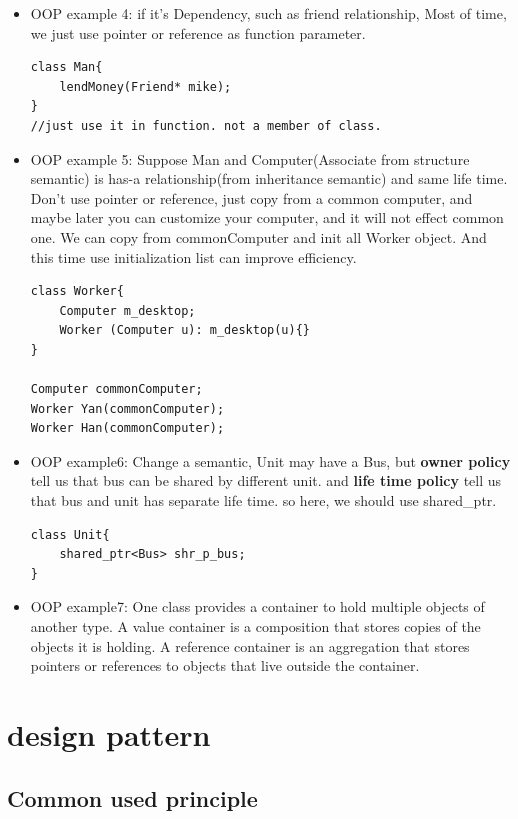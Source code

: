 \documentclass[a4paper,11pt,twoside]{book}
\begin{document}
\begin{itemize}
	\item OOP example 4: if it's Dependency,  such as friend relationship,  Most of time, we just use pointer or reference as function parameter.
\begin{lstlisting}[numbers=none]
class Man{
	lendMoney(Friend* mike);
}
//just use it in function. not a member of class.
\end{lstlisting}
	
	\item OOP example 5: Suppose Man and Computer(Associate from structure semantic) is has-a relationship(from inheritance semantic) and same life time. Don't use pointer or reference, just copy from a common computer, and maybe later you can customize your computer, and it will not effect common one.  We can copy from commonComputer and init all Worker object.  And this time use initialization list can improve efficiency.
\begin{lstlisting}[numbers=none]
class Worker{
	Computer m_desktop;
	Worker (Computer u): m_desktop(u){}
}
	
Computer commonComputer;
Worker Yan(commonComputer);
Worker Han(commonComputer);
\end{lstlisting}
	
	
	\item OOP example6:  Change a semantic,  Unit may have a Bus, but \textbf{owner policy} tell us that bus can be shared by different unit. and \textbf{life time policy} tell us that bus and unit has separate life time. so here, we should use shared\_ptr.
\begin{lstlisting}[numbers=none]
class Unit{
	shared_ptr<Bus> shr_p_bus;
}
\end{lstlisting}
	
	\item OOP example7: One class provides a container to hold multiple objects of another type. A value container is a composition that stores copies of the objects it is holding. A reference container is an aggregation that stores pointers or references to objects that live outside the container.
	
\end{itemize}




\section{design pattern}

\subsection{Common used principle}
\end{document}
